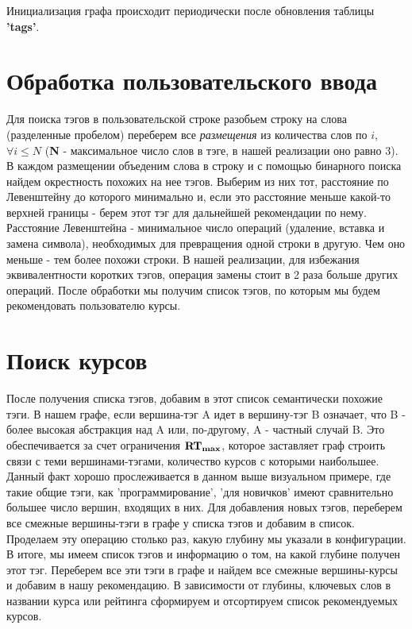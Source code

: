 \documentclass[12pt]{article}
\begin{document}
\noindent Инициализация графа происходит периодически после обновления таблицы \textbf{'tags'}.

\section*{Обработка пользовательского ввода}
Для поиска тэгов в пользовательской строке разобьем строку на слова (разделенные пробелом) переберем все \textit{размещения} из количества слов по $i$, $\forall i \leq N$ (\textbf{N} - максимальное число слов в тэге, в нашей реализации оно равно $3$). \newline
В каждом размещении объеденим слова в строку и с помощью бинарного поиска найдем окрестность похожих на нее тэгов. Выберим из них тот, расстояние по Левенштейну до которого минимально и, если это расстояние меньше какой-то верхней границы - берем этот тэг для дальнейшей рекомендации по нему. \newline
Расстояние Левенштейна - минимальное число операций (удаление, вставка и замена символа), необходимых для превращения одной строки в другую. Чем оно меньше - тем более похожи строки. В нашей реализации, для избежания эквивалентности коротких тэгов, операция замены стоит в 2 раза больше других операций. \newline
После обработки мы получим список тэгов, по которым мы будем рекомендовать пользователю курсы. \newline

\section*{Поиск курсов}
После получения списка тэгов, добавим в этот список семантически похожие тэги. \newline
В нашем графе, если вершина-тэг A идет в вершину-тэг B означает, что B - более высокая абстракция над A или, по-другому, A - частный случай B. \newline
Это обеспечивается за счет ограничения $\bf{RT_{max}}$, которое заставляет граф строить связи с теми вершинами-тэгами, количество курсов с которыми наибольшее. \newline
Данный факт хорошо прослеживается в данном выше визуальном примере, где такие общие тэги, как 'программирование', 'для новичков' имеют сравнительно большее число вершин, входящих в них. \newline
Для добавления новых тэгов, переберем все смежные вершины-тэги в графе у списка тэгов и добавим в список. Проделаем эту операцию столько раз, какую глубину мы указали в конфигурации. \newline
В итоге, мы имеем список тэгов и информацию о том, на какой глубине получен этот тэг. Переберем все эти тэги в графе и найдем все смежные вершины-курсы и добавим в нашу рекомендацию. В зависимости от глубины, ключевых слов в названии курса или рейтинга сформируем и отсортируем список рекомендуемых курсов.
\end{document}

